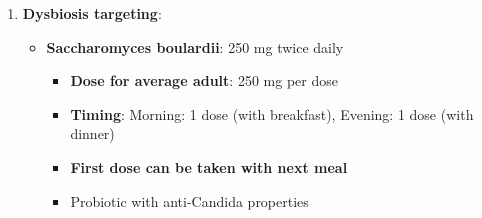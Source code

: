 \begin{enumerate}
    \item \textbf{Dysbiosis targeting}:
    \begin{itemize}
        \item \textbf{Saccharomyces boulardii}: 250 mg twice daily
        \begin{itemize}
            \item \textbf{Dose for average adult}: 250 mg per dose
            \item \textbf{Timing}: Morning: 1 dose (with breakfast), Evening: 1 dose (with dinner)
            \item \textbf{First dose can be taken with next meal}
            \item Probiotic with anti-Candida properties
        \end{itemize}


\end{itemize}
\end{enumerate}
